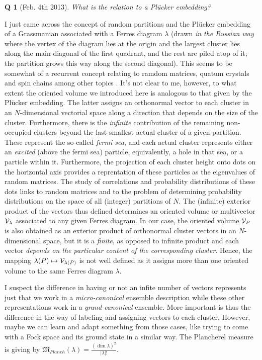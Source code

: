 \documentclass[twocolumn,aps,sort,nofootinbib]{revtex4}
\newtheorem{question}{Q}
\begin{document}
\begin{question}[Feb. 4th 2013]
What is the relation to a Pl\"ucker embedding? 
\end{question}
I just came across
the concept of random partitions and the Pl\"ucker embedding of a Grassmanian associated
with a Ferres diagram $\lambda$ (drawn {\sl in the Russian way} where the vertex of the diagram
lies at the origin and the largest cluster lies along the main diagonal of the first quadrant,
and the rest are piled atop of it; the partition grows this way along the second diagonal). 
This seems to be somewhat of a recurrent concept relating to ramdom matrices,
quatum crystals and spin chains among other topics \cite{Okounkov03,Dijkgraaf08}. 
It's not clear to me, however, to what
extent the oriented volume we introduced here is analogous to that given by the Pl\"ucker
embedding. The latter assigns an orthonormal vector to each cluster in an $N$-dimensional 
vectorial space along a direction that depends on the size of the cluster. Furthermore,
there is the {\sl infinite} contribution of the remaining non-occupied clusters beyond the last
smallest actual cluster of a given partition. These represent the so-called {\sl fermi sea},
and each actual cluster represents either an {\sl excited} (above the fermi sea) particle,
equivalently, a hole in that sea, or a particle within it. 
Furthermore, the projection of each cluster height onto dots on the horizontal axis provides
a reprentation of these particles as the eigenvalues of random matrices. 
The study of correlations and probability distributions of these dots links to random
matrices and to the problem of determining probability distributions on the space
of all (integer) partitions of $N$.
The (infinite) exterior product of the vectors thus defined determines an oriented volume or
multivector ${\cal V}_\lambda$ associated to any given Ferres diagram. 
In our case, the oriented volume ${\cal V}_P$ is also obtained as an exterior product of
orthonormal cluster vectors in an $N$-dimensional space, but it is a {\sl finite}, 
as opposed to infinite product and each vector
{\sl depends on the particular content of the corresponding cluster}. 
Hence, the mapping $\lambda(P)\mapsto{\cal V}_{\lambda(P)}$ is not well defined as it assigns
more than one oriented volume to the same Ferres diagram $\lambda$.

I suspect the difference in having or not an infite number of vectors represents just
that we work in a {\sl micro-canonical} ensemble description while these other
representations work in a {\sl grand-canonical} ensemble. More important
is thus the difference in the way of labeling and assigning vectors
to each cluster. However, maybe we can learn and adapt something
from those cases, like trying to come with a Fock space and its
ground state in a similar way. The Plancherel measure is giving by
$\mathfrak{M}_{Planch}(\lambda)=\frac{(\dim\lambda)^2}{|\lambda|!}$.	
\end{document}
